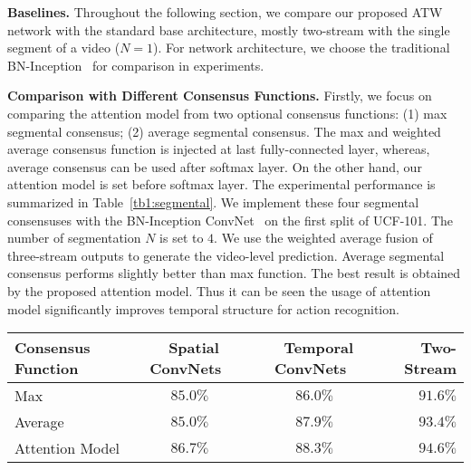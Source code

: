 \documentclass[runningheads,a4paper]{llncs}
\begin{document}
\noindent \textbf{Baselines.} Throughout the following section, we compare our proposed ATW network with the standard base architecture, mostly
two-stream with the single segment of a video ($N=1$). For network architecture, we choose the
traditional BN-Inception~\cite{ioffe2015batch} for comparison in experiments.
%


%

\noindent \textbf{Comparison with Different Consensus Functions.}
Firstly, we focus on comparing the attention model from two optional consensus
functions: (1) max segmental consensus; (2) average segmental consensus.
The max and weighted average consensus function is injected
at last fully-connected layer, whereas, average consensus can be used after softmax layer.
On the other hand, our attention model is set before softmax layer.
The experimental performance is summarized in Table~\ref{tb1:segmental}. We implement these
four segmental consensuses with the BN-Inception ConvNet~\cite{ioffe2015batch} on the first split of UCF-101.
The number of segmentation $N$ is set to $4$. We use the weighted average fusion of three-stream outputs to generate the video-level prediction.
Average segmental consensus performs slightly better than max function.
The best result is obtained by the proposed attention model. Thus it can be seen the usage of attention model
significantly improves temporal structure for action recognition.
%
\begin{table*}[t]
	\caption{Exploration of different segmental consensus functions on the UCF-101 dataset (split1).}
	\label{tb1:segmental}
	\begin{center}
		\begin{small}
			\begin{tabular}{lccr}
				\toprule
				Consensus Function~ & ~Spatial ConvNets~  & ~Temporal ConvNets~ & ~Two-Stream \\
				\midrule
				Max & $ 85.0\%  $& $ 86.0\% $ & $ 91.6\% $  \\
				Average &  $ 85.0\% $ &  $ 87.9\% $ & $ 93.4\% $ \\
				Attention Model & $\mathbf{86.7}\%$ & $\mathbf{88.3}\%$ & $\mathbf{94.6}\%$ \\
			 \bottomrule
			\end{tabular}
		\end{small}
	\end{center}
\end{table*}
%
\end{document}
